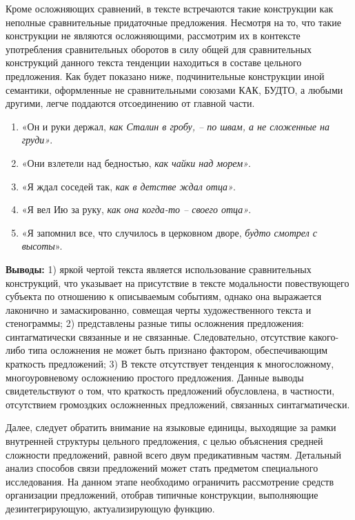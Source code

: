\documentclass{kursa4}
\begin{document}
{      Кроме осложняющих сравнений, в тексте встречаются такие конструкции  как неполные сравнительные придаточные предложения. Несмотря на то, что такие конструкции не являются осложняющими, рассмотрим их в контексте употребления сравнительных оборотов в силу общей для сравнительных конструкций данного текста тенденции находиться в составе цельного предложения. Как будет показано ниже, подчинительные конструкции иной семантики, оформленные не сравнительными союзами КАК, БУДТО, а любыми другими, легче поддаются отсоединению от главной части. 
       \begin{enumerate}
          \item «Он и руки держал, \textit{как Сталин в гробу, – по швам, а не сложенные на груди»}.
          \item «Они взлетели над бедностью, \textit{как чайки над морем»}.
          \item «Я ждал соседей так, \textit{как в детстве ждал отца»}.
          \item «Я вел Ию за руку, \textit{как она когда-то – своего отца»}.
          \item «Я запомнил все, что случилось в церковном дворе, \textit{будто смотрел с высоты}».
      \end{enumerate}

      \textbf{Выводы:} 1) яркой чертой текста является использование сравнительных конструкций, что указывает на присутствие в тексте модальности повествующего субъекта по отношению к описываемым событиям, однако она выражается лаконично и замаскированно, совмещая черты художественного текста и стенограммы; 2) представлены разные типы осложнения предложения: синтагматически связанные и не связанные. Следовательно, отсутствие какого-либо типа осложнения не может быть признано фактором, обеспечивающим краткость предложений; 3) В тексте отсутствует тенденция к многосложному, многоуровневому осложнению простого предложения. Данные выводы свидетельствуют о том, что краткость предложений обусловлена, в частности, отсутствием громоздких осложненных предложений, связанных синтагматически.
          
      Далее, следует обратить внимание на языковые единицы, выходящие за рамки внутренней структуры цельного предложения, с целью объяснения средней сложности предложений, равной всего двум предикативным частям.   Детальный анализ способов связи предложений может стать предметом специального исследования. На данном этапе необходимо ограничить рассмотрение средств организации предложений, отобрав типичные конструкции, выполняющие дезинтегрирующую, актуализирующую функцию.
        
}
\end{document}

